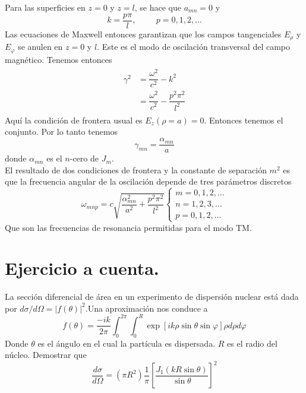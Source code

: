 Para las superficies en $z=0$ y $z=l$, se hace que $a_{mn}=0$ y
\begin{equation}
k = \dfrac{p \pi}{l}, \hspace{1cm} p=0,1,2,\ldots
\label{eq:ecuacion_11_41}
\end{equation}
Las ecuaciones de Maxwell entonces garantizan que los campos tangenciales $E_{\rho}$ y $E_{\varphi}$ se anulen en $z=0$ y $l$. Este es el modo de oscilación transversal del campo magnético. Tenemos entonces
\begin{eqnarray}
\begin{aligned}
\gamma^{2} &= \dfrac{\omega^{2}}{c^{2}} - k^{2} \\
&= \dfrac{\omega^{2}}{c^{2}} - \dfrac{p^{2} \pi^{2}}{l^{2}}
\end{aligned}
\label{eq:ecuacion_11_42}
\end{eqnarray}
Aquí la condición de frontera usual es $E_{z}(\rho =a)=0$. Entonces tenemos el conjunto. Por lo tanto tenemos
\begin{equation}
\gamma_{mn} = \dfrac{\alpha_{mn}}{a}
\label{eq:ecuacion_11_43}
\end{equation}
donde $\alpha_{mn}$ es el $n$-cero de $J_{m}$.
\\
El resultado de dos condiciones de frontera y la constante de separación $m^{2}$ es que la frecuencia angular de la oscilación depende de tres parámetros discretos
\begin{equation}
\omega_{mnp} = c \sqrt{\dfrac{\alpha^{2}_{mn}}{a^{2}} + \dfrac{p^{2} \pi^{2}}{l^{2}}} 
\begin{cases}
m = 0,1,2, \ldots \\
n = 1,2,3, \ldots \\
p = 0,1,2, \ldots
\end{cases}
\label{eq:ecuacion_11_44}
\end{equation}
Que son las frecuencias de resonancia permitidas para el modo TM.
\section{Ejercicio a cuenta.}
La sección diferencial de área en un experimento de dispersión nuclear está dada por $d \sigma / d \Omega = \vert f(\theta) \vert^{2}$.Una aproximación nos conduce a
\[ f(\theta) = \dfrac{-ik}{2 \pi} \int_{0}^{2\pi} \int_{0}^{R} \exp[ik \rho \sin \theta \sin \varphi] \rho d \rho d \varphi \]
Donde $\theta$ es el ángulo en el cual la partícula es dispersada. $R$ es el radio del núcleo. Demostrar que
\[ \dfrac{d \sigma}{d \Omega} = (\pi R^{2}) \dfrac{1}{\pi} \left[ \dfrac{J_{1} (k R \sin \theta)}{\sin \theta} \right]^{2} \]

